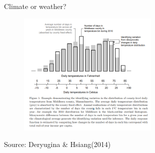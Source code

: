 \documentclass{beamer}
\begin{document}
\begin{frame}{Climate or weather?}
  \begin{figure}[h]
  \centering
  \includegraphics[width=0.6\textwidth]{climate_weather.png}
  \end{figure}
  Source: Deryugina \& Hsiang(2014)
\end{frame}

\end{document}
